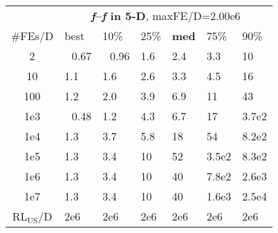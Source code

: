 \begin{tabular}{c|llllll}
 & \multicolumn{6}{|c}{\textbf{\textit{f}\raisebox{-0.35ex}{1}--\textit{f}\raisebox{-0.35ex}{24} in 5-D}, maxFE/D=2.00e6}\\
\#FEs/D & best & 10\% & 25\% & \textbf{med} & 75\% & 90\%\\
2 & ~\,0.67 & ~\,0.96 & \hspace*{1ex}1.6 & \hspace*{1ex}2.4 & \hspace*{1ex}3.3 & 10\\
10 & \hspace*{1ex}1.1 & \hspace*{1ex}1.6 & \hspace*{1ex}2.6 & \hspace*{1ex}3.3 & \hspace*{1ex}4.5 & 16\\
100 & \hspace*{1ex}1.2 & \hspace*{1ex}2.0 & \hspace*{1ex}3.9 & \hspace*{1ex}6.9 & 11 & 43\\
1e3 & ~\,0.48 & \hspace*{1ex}1.2 & \hspace*{1ex}4.3 & \hspace*{1ex}6.7 & 17 & 3.7e2\\
1e4 & \hspace*{1ex}1.3 & \hspace*{1ex}3.7 & \hspace*{1ex}5.8 & 18 & 54 & 8.2e2\\
1e5 & \hspace*{1ex}1.3 & \hspace*{1ex}3.4 & 10 & 52 & 3.5e2 & 8.3e2\\
1e6 & \hspace*{1ex}1.3 & \hspace*{1ex}3.4 & 10 & 40 & 7.8e2 & 2.6e3\\
1e7 & \hspace*{1ex}1.3 & \hspace*{1ex}3.4 & 10 & 40 & 1.6e3 & 2.5e4\\
$\text{RL}_{\text{US}}$/D & 2e6 & 2e6 & 2e6 & 2e6 & 2e6 & 2e6
\end{tabular}
